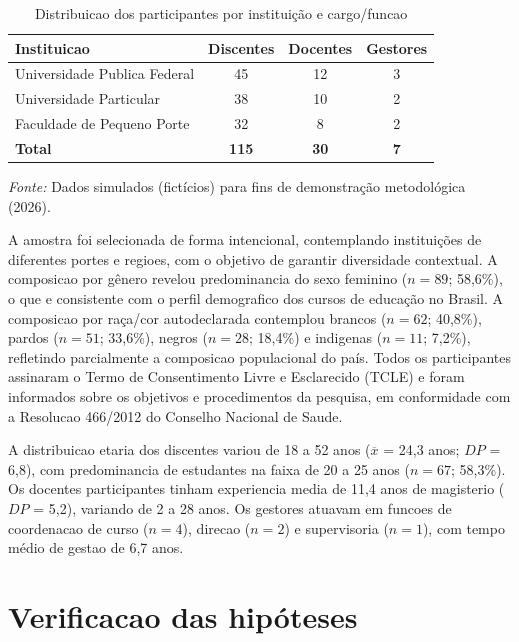 \begin{table}[htbp]
    \centering
    \caption{Distribuicao dos participantes por instituição e cargo/funcao}
    \label{tab:distribuicao_amostra}
    \small
    \begin{tabular}{lccc}
        \toprule
        \textbf{Instituicao} & \textbf{Discentes} & \textbf{Docentes} & \textbf{Gestores} \\
        \midrule
        Universidade Publica Federal & 45 & 12 & 3 \\
        Universidade Particular & 38 & 10 & 2 \\
        Faculdade de Pequeno Porte & 32 & 8 & 2 \\
        \midrule
        \textbf{Total} & \textbf{115} & \textbf{30} & \textbf{7} \\
        \bottomrule
    \end{tabular}
    \par\medskip
    \footnotesize{\textit{Fonte:} Dados simulados (fictícios) para fins de demonstração metodológica (2026).}
\end{table}

A amostra foi selecionada de forma intencional, contemplando instituições de diferentes portes e regioes, com o objetivo de garantir diversidade contextual. A composicao por gênero revelou predominancia do sexo feminino ($n = 89$; 58,6\%), o que e consistente com o perfil demografico dos cursos de educação no Brasil. A composicao por raça/cor autodeclarada contemplou brancos ($n = 62$; 40,8\%), pardos ($n = 51$; 33,6\%), negros ($n = 28$; 18,4\%) e indigenas ($n = 11$; 7,2\%), refletindo parcialmente a composicao populacional do país. Todos os participantes assinaram o Termo de Consentimento Livre e Esclarecido (TCLE) e foram informados sobre os objetivos e procedimentos da pesquisa, em conformidade com a Resolucao 466/2012 do Conselho Nacional de Saude.

A distribuicao etaria dos discentes variou de 18 a 52 anos ($\overline{x}$ = 24,3 anos; $DP$ = 6,8), com predominancia de estudantes na faixa de 20 a 25 anos ($n = 67$; 58,3\%). Os docentes participantes tinham experiencia media de 11,4 anos de magisterio ($DP$ = 5,2), variando de 2 a 28 anos. Os gestores atuavam em funcoes de coordenacao de curso ($n = 4$), direcao ($n = 2$) e supervisoria ($n = 1$), com tempo médio de gestao de 6,7 anos.

\section{Verificacao das hipóteses}
\label{sec:verificação_hipóteses}

